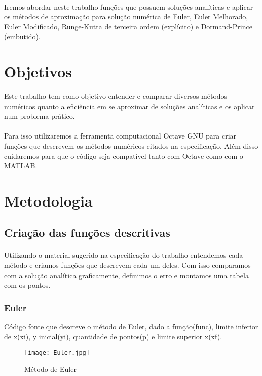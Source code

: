 \documentclass{article}
\begin{document}
\paragraph{}Iremos abordar neste trabalho fun\c c\~oes que possuem solu\c c\~oes anal\'iticas e aplicar os m\'etodos de aproxima\c c\~ao para solu\c c\~ao num\'erica
de Euler, Euler Melhorado, Euler Modificado, Runge-Kutta de terceira ordem (expl\'icito) e Dormand-Prince (embutido).
\newpage
\section{Objetivos}
\paragraph{}Este trabalho tem como objetivo entender e comparar diversos m\'etodos num\'ericos quanto a efici\^encia em se aproximar de solu\c c\~oes anal\'iticas e 
os aplicar num problema pr\'atico.
\paragraph{}Para isso utilizaremos a ferramenta computacional Octave GNU para criar fun\c c\~oes que descrevem os m\'etodos num\'ericos citados na especifica\c c\~ao.
Al\'em disso cuidaremos para que o c\'odigo seja compat\'ivel tanto com Octave como com o MATLAB.

\newpage
\section{Metodologia}
	\subsection{Cria\c c\~ao das fun\c c\~oes descritivas}
	\paragraph{}Utilizando o material sugerido na especifica\c c\~ao do trabalho entendemos cada m\'etodo e criamos fun\c c\~oes que descrevem cada um deles. Com isso 
	comparamos com a solu\c c\~ao anal\'itica graficamente, definimos o erro e montamos uma tabela com os pontos.
		\subsubsection{Euler}
		C\'odigo fonte que descreve o m\'etodo de Euler, dado a fun\c c\~ao(func), limite inferior de x(xi), 
		y inicial(yi), quantidade de pontos(p) e limite superior x(xf).
			\begin{figure}[h!]
			\texttt{[image: Euler.jpg]}
			\caption{M\'etodo de Euler}
			\end{figure}
\end{document}
